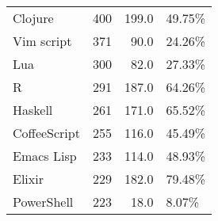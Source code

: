 \begin{table}
\begin{tabular}{lrrl}
Clojure          &          400 &     199.0 &        49.75\% \\
Vim script       &          371 &      90.0 &        24.26\% \\
Lua              &          300 &      82.0 &        27.33\% \\
R                &          291 &     187.0 &        64.26\% \\
Haskell          &          261 &     171.0 &        65.52\% \\
CoffeeScript     &          255 &     116.0 &        45.49\% \\
Emacs Lisp       &          233 &     114.0 &        48.93\% \\
Elixir           &          229 &     182.0 &        79.48\% \\
PowerShell       &          223 &      18.0 &         8.07\% \\

\end{tabular}
\end{table}
